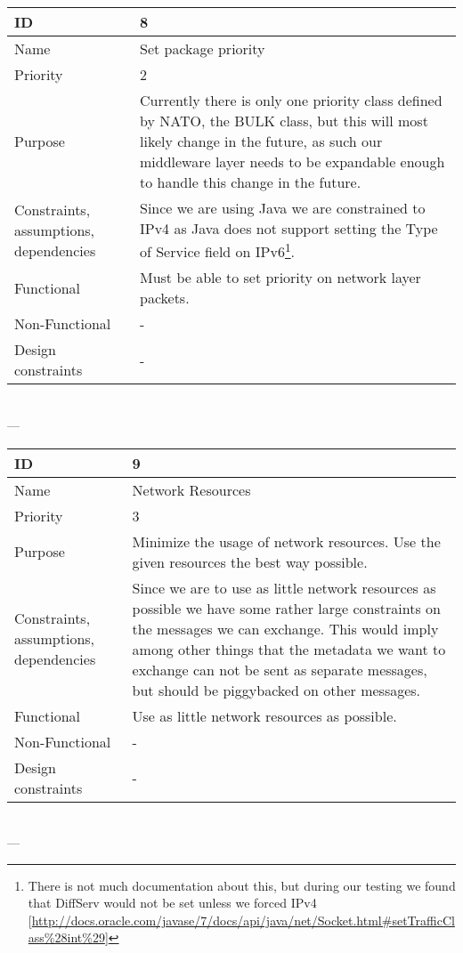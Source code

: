 \begin{center}
    \begin{tabular}{| p{4cm} | p{8cm} |}
        \hline
        ID & 8 \\
        \hline
        Name & Set package priority \\
        \hline
        Priority & 2 \\
        \hline
        Purpose & Currently there is only one priority class defined by NATO, the BULK class, but this will most likely change in the future, as such our middleware layer needs to be expandable enough to handle this change in the future. \\
        \hline 
        Constraints, assumptions, dependencies & Since we are using Java we are constrained to IPv4 as Java does not support setting the Type of Service field on IPv6\footnote{There is not much documentation about this, but during our testing we found that DiffServ would not be set unless we forced IPv4 [\url{http://docs.oracle.com/javase/7/docs/api/java/net/Socket.html#setTrafficClass\%28int\%29}]}.\\
        \hline  
        Functional & Must be able to set priority on network layer packets.\\
        \hline
        Non-Functional & -\\ 
        \hline
        Design constraints & - \\
        \hline
    \end{tabular}
    \\  ---  \\
    
    \begin{tabular}{| p{4cm} | p{8cm} |}
        \hline
        ID & 9 \\
        \hline
        Name & Network Resources \\
        \hline
        Priority & 3 \\
        \hline
        Purpose & Minimize the usage of network resources. Use the given resources the best way possible. \\
        \hline 
        Constraints, assumptions, dependencies & Since we are to use as little network resources as possible we have some rather large constraints on the messages we can exchange. This would imply among other things that the metadata we want to exchange can not be sent as separate messages, but should be piggybacked on other messages. \\
        \hline  
        Functional & Use as little network resources as possible.\\
        \hline
        Non-Functional & -\\ 
        \hline
        Design constraints & -\\
        \hline
    \end{tabular}
    \\  ---  \\
    

\end{center}
